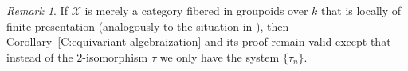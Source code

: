 \documentclass[a4paper]{amsart}
\theoremstyle{plain}
\theoremstyle{definition}
\theoremstyle{remark}
\newtheorem{remark}[theorem]{Remark}
\numberwithin{equation}{section}
\newcommand\cX{\mathcal{X}}
\begin{document}
\begin{remark}
If $\cX$ is merely a category fibered in groupoids over $k$ that is locally of
finite presentation (analogously to the situation in
\cite[Thm.~1.6]{artin-algebraization}), then
Corollary~\ref{C:equivariant-algebraization} and its proof remain valid except
that instead of the $2$-isomorphism $\tau$ we only have the system
$\{\tau_n\}$.
\end{remark}




\end{document}
